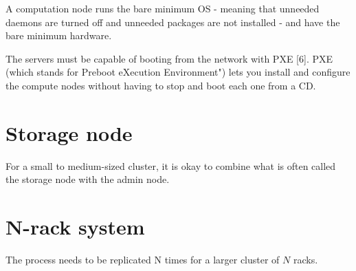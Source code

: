 A computation node runs the bare minimum OS - meaning that unneeded daemons are
turned off and unneeded packages are not installed - and have the bare minimum
hardware.

The servers must be capable of booting from the network with PXE [6]. PXE (which
stands for Preboot eXecution Environment") lets you install and configure the
compute nodes without having to stop and boot each one from a CD.

\section{Storage node}

For a small to medium-sized cluster, it is okay to combine what is often called
the storage node with the admin node.


\section{N-rack system}

The process needs to be replicated N times for a larger cluster of $N$ racks.


